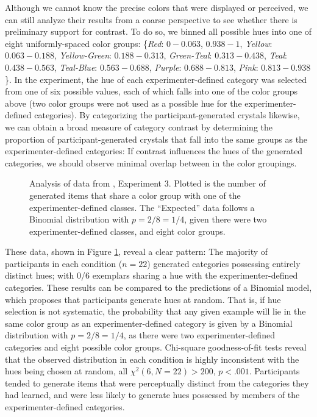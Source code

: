 \documentclass[12pt]{article}
\newcommand\inputpgf[2]{{
\let\pgfimageWithoutPath\pgfimage
\renewcommand{\pgfimage}[2][]{\pgfimageWithoutPath[##1]{#1/##2}}

}}
\begin{document}
\begin{flushleft}
Although we cannot know the precise colors that were displayed or perceived, we
can still analyze their results from a coarse perspective to see whether there
is preliminary support for contrast. To do so, we binned all possible hues into
one of eight uniformly-spaced color groups: \{{\em Red}: $0-0.063$, $0.938-1$,
{\em Yellow}: $0.063-0.188$, {\em Yellow-Green}: $0.188-0.313$, {\em
Green-Teal}: $0.313-0.438$, {\em Teal}: $0.438-0.563$, {\em Teal-Blue}:
$0.563-0.688$, {\em Purple}: $0.688-0.813$, {\em Pink}: $0.813-0.938$\}. In the
\cite{jern2013probabilistic} experiment, the hue of each experimenter-defined
category was selected from one of six possible values, each of which falls into
one of the color groups above (two color groups were not used as a possible hue
for the experimenter-defined categories). By categorizing the
participant-generated crystals likewise, we can obtain a broad measure of
category contrast by determining the proportion of participant-generated
crystals that fall into the same groups as the experimenter-defined categories:
If contrast influences the hues of the generated categories, we should observe
minimal overlap between in the color groupings.



\begin{figure}
    \begin{center} \inputpgf{figs/}{jk13-huecontrast.pgf}
        \caption{Analysis of data from \cite{jern2013probabilistic}, Experiment
3. Plotted is the number of generated items that share a color group with one of
the experimenter-defined classes. The ``Expected'' data follows a Binomial
distribution with $p = 2/8 = 1/4$, given there were two experimenter-defined
classes, and eight color groups.}
        \label{fig:jk13-huecontrast}
    \end{center}
\end{figure}

These data, shown in Figure \ref{fig:jk13-huecontrast}, reveal a clear pattern:
The majority of participants in each condition ($n = 22$) generated categories
possessing entirely distinct hues; with 0/6 exemplars sharing a hue with the
experimenter-defined categories. These results can be compared to the
predictions of a Binomial model, which proposes that participants generate hues
at random. That is, if hue selection is not systematic, the probability that any
given example will lie in the same color group as an experimenter-defined
category is given by a Binomial distribution with $p = 2/8=1/4$, as there were
two experimenter-defined categories and eight possible color groups. Chi-square
goodness-of-fit tests reveal that the observed distribution in each condition is
highly inconsistent with the hues being chosen at random, all
$\chi^2(6,N=22)>200$, $p < .001$. Participants tended to generate items that were
perceptually distinct from the categories they had learned, and were less likely
to generate hues possessed by members of the experimenter-defined categories.


\end{flushleft}
\end{document}
